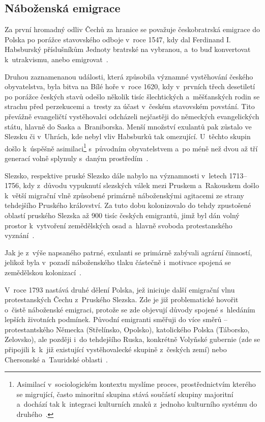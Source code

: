 \hypertarget{nuxe1boux17eenskuxe1-emigrace}{%
\subsection{Náboženská emigrace}\label{nuxe1boux17eenskuxe1-emigrace}}

Za první hromadný odliv Čechů za hranice se považuje českobratrská emigrace do Polska po porážce stavovského odboje v~roce 1547, kdy dal Ferdinand I. Habsburský příslušníkům Jednoty bratrské na vybranou, a~to buď konvertovat k~utrakvismu, anebo emigrovat~\parencite{Vaculik2009a}.

Druhou zaznamenanou události, která způsobila významné vystěhování českého obyvatelstva, byla bitva na Bílé hoře v~roce 1620, kdy v~prvních třech desetiletí po porážce českých stavů odešlo několik tisíc šlechtických a~měšťanských rodin se strachu před perzekucemi a~tresty za účast v~českém stavovském povstání. Tito převážně evangeličtí vystěhovalci odcházeli nejčastěji do německých evangelických státu, hlavně do Saska a~Braniborska. Menší množství exulantů pak zůstalo ve Slezsku či v~Uhrách, kde nebyl vliv Habsburků tak omezující. U~těchto skupin došlo k~úspěšně asimilaci\footnote{Asimilací v~sociologickém kontextu myslíme proces, prostřednictvím kterého se migrující, často minoritní skupina stává součástí skupiny majoritní a~dochází tak k~integraci kulturních znaků z~jednoho kulturního systému do druhého~\parencite{Petrusek2017}.} s~původním obyvatelstvem a~po méně než dvou až tří generací volně splynuly s~daným prostředím~\parencite{Vaculik2002}.

Slezsko, respektive pruské Slezsko dále nabylo na významnosti v~letech 1713--1756, kdy z~důvodu vypuknutí slezských válek mezi Pruskem a~Rakouskem došlo k~větší migrační vlně způsobené primárně náboženskými agitacemi ze strany tehdejšího Pruského království. Za tuto dobu kolonizovalo do tehdy zpustošené oblastí pruského Slezska až 900 tisíc českých emigrantů, jimž byl dán volný prostor k~vytvoření zemědělských osad a~hlavně svoboda protestanského vyznání~\parencite{Vaculik2002}.

Jak je z~výše napsaného patrné, exulanti se primárně zabývali agrární činností, jelikož byla v~pozadí náboženského tlaku částečně i~motivace spojená se zemědělskou kolonizací~\parencite{Broucek2017}.

V~roce 1793 nastává druhé dělení Polska, jež iniciuje další emigrační vlnu protestanských Čechu z~Pruského Slezska. Zde je již problematické hovořit o~čistě náboženské emigraci, protože se zde objevují důvody spojené s~hledáním lepších životních podmínek. Původní emigranti směřuji do více směrů -- protestantského Německa (Střelínsko, Opolsko), katolického Polska (Táborsko, Zelovsko), ale později i~do tehdejšího Ruska, konkrétně Volyňské gubernie (zde se připojili k~k~již existující vystěhovalecké skupině z~českých zemí) nebo Chersonské a~Tauridské oblasti~\parencite{Vaculik2009a}.

